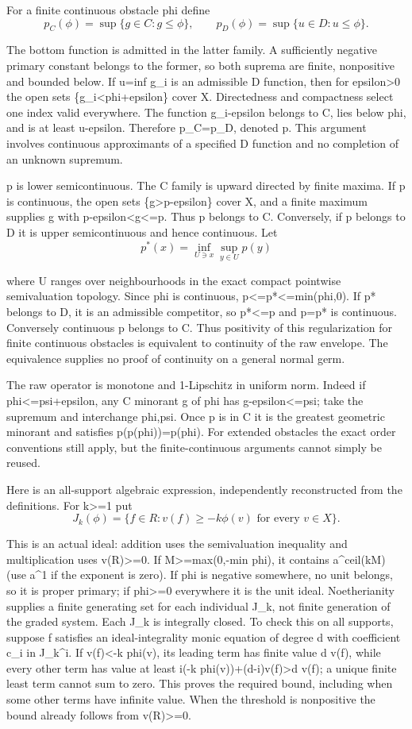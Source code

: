 \documentclass[11pt]{article}
\begin{document}
For a finite continuous obstacle phi define
\[
p_C(\phi)=\sup\{g\in C:g\le\phi\},\qquad p_D(\phi)=\sup\{u\in D:u\le\phi\}.
\]

The bottom function is admitted in the latter family. A sufficiently negative primary constant belongs to the former, so both suprema are finite, nonpositive and bounded below. If u=inf g\_i is an admissible D function, then for epsilon>0 the open sets \{g\_i<phi+epsilon\} cover X. Directedness and compactness select one index valid everywhere. The function g\_i-epsilon belongs to C, lies below phi, and is at least u-epsilon. Therefore p\_C=p\_D, denoted p. This argument involves continuous approximants of a specified D function and no completion of an unknown supremum.

p is lower semicontinuous. The C family is upward directed by finite maxima. If p is continuous, the open sets \{g>p-epsilon\} cover X, and a finite maximum supplies g with p-epsilon<g<=p. Thus p belongs to C. Conversely, if p belongs to D it is upper semicontinuous and hence continuous. Let
\[
p^*(x)=\inf_{U\ni x}\sup_{y\in U}p(y)
\]

where U ranges over neighbourhoods in the exact compact pointwise semivaluation topology. Since phi is continuous, p<=p*<=min(phi,0). If p* belongs to D, it is an admissible competitor, so p*<=p and p=p* is continuous. Conversely continuous p belongs to C. Thus positivity of this regularization for finite continuous obstacles is equivalent to continuity of the raw envelope. The equivalence supplies no proof of continuity on a general normal germ.

The raw operator is monotone and 1-Lipschitz in uniform norm. Indeed if phi<=psi+epsilon, any C minorant g of phi has g-epsilon<=psi; take the supremum and interchange phi,psi. Once p is in C it is the greatest geometric minorant and satisfies p(p(phi))=p(phi). For extended obstacles the exact order conventions still apply, but the finite-continuous arguments cannot simply be reused.

Here is an all-support algebraic expression, independently reconstructed from the definitions. For k>=1 put
\[
J_k(\phi)=\{f\in R:v(f)\ge-k\phi(v)\text{ for every }v\in X\}.
\]

This is an actual ideal: addition uses the semivaluation inequality and multiplication uses v(R)>=0. If M>=max(0,-min phi), it contains a\textasciicircum{}ceil(kM) (use a\textasciicircum{}1 if the exponent is zero). If phi is negative somewhere, no unit belongs, so it is proper primary; if phi>=0 everywhere it is the unit ideal. Noetherianity supplies a finite generating set for each individual J\_k, not finite generation of the graded system. Each J\_k is integrally closed. To check this on all supports, suppose f satisfies an ideal-integrality monic equation of degree d with coefficient c\_i in J\_k\textasciicircum{}i. If v(f)<-k phi(v), its leading term has finite value d v(f), while every other term has value at least i(-k phi(v))+(d-i)v(f)>d v(f); a unique finite least term cannot sum to zero. This proves the required bound, including when some other terms have infinite value. When the threshold is nonpositive the bound already follows from v(R)>=0.
\end{document}
